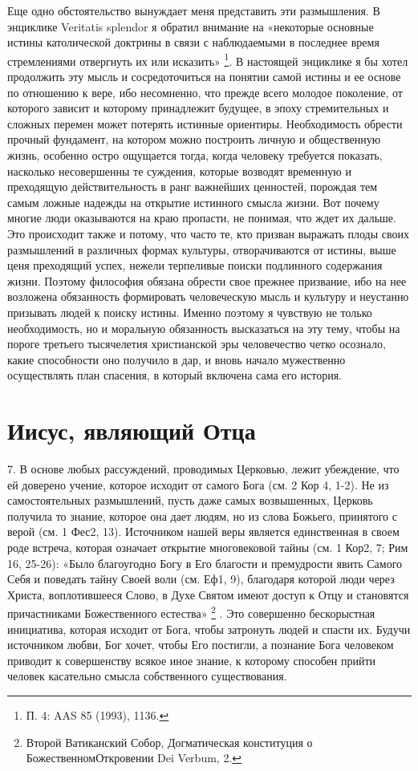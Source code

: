 \documentclass[a5paper,10pt]{article}
\begin{document}
Еще одно обстоятельство вынуждает меня представить эти размышления. В энциклике
Veritatis splendor я обратил внимание на «некоторые основные истины
католической доктрины в связи с наблюдаемыми в последнее время стремлениями
отвергнуть их или исказить» \footnote{П. 4: AAS 85 (1993), 1136.}. В настоящей
энциклике я бы хотел продолжить эту мысль и сосредоточиться на понятии самой
истины и ее основе по отношению к вере, ибо несомненно, что прежде всего
молодое поколение, от которого зависит и которому принадлежит будущее, в эпоху
стремительных и сложных перемен может потерять истинные ориентиры.
Необходимость обрести прочный фундамент, на котором можно построить личную и
общественную жизнь, особенно остро ощущается тогда, когда человеку требуется
показать, насколько несовершенны те суждения, которые возводят временную и
преходящую действительность в ранг важнейших ценностей, порождая тем самым
ложные надежды на открытие истинного смысла жизни. Вот почему многие люди
оказываются на краю пропасти, не понимая, что ждет их дальше. Это происходит
также и потому, что часто те, кто призван выражать плоды своих размышлений в
различных формах культуры, отворачиваются от истины, выше ценя преходящий
успех, нежели терпеливые поиски подлинного содержания жизни. Поэтому философия
обязана обрести свое прежнее призвание, ибо на нее возложена обязанность
формировать человеческую мысль и культуру и неустанно призывать людей к поиску
истины. Именно поэтому я чувствую не только необходимость, но и моральную
обязанность высказаться на эту тему, чтобы на пороге третьего тысячелетия
христианской эры человечество четко осознало, какие способности оно получило в
дар, и вновь начало мужественно осуществлять план спасения, в который включена
сама его история. 

\section{Иисус, являющий Отца}

7. В основе любых рассуждений, проводимых Церковью, лежит убеждение, что ей
доверено учение, которое исходит от самого Бога (см. 2 Кор 4, 1-2). Не из
самостоятельных размышлений, пусть даже самых возвышенных, Церковь получила то
знание, которое она дает людям, но из слова Божьего, принятого с верой (см. 1
Фес2, 13). Источником нашей веры является единственная в своем роде встреча,
которая означает открытие многовековой тайны (см. 1 Кор2, 7; Рим 16, 25-26):
«Было благоугодно Богу в Его благости и премудрости явить Самого Себя и
поведать тайну Своей воли (см. Еф1, 9), благодаря которой люди через Христа,
воплотившееся Слово, в Духе Святом имеют доступ к Отцу и становятся
причастниками Божественного естества» \footnote{Второй Ватиканский Собор,
Догматическая конституция о БожественномОткровении Dei Verbum, 2.} . Это
совершенно бескорыстная инициатива, которая исходит от Бога, чтобы затронуть
людей и спасти их. Будучи источником любви, Бог хочет, чтобы Его постигли, а
познание Бога человеком приводит к совершенству всякое иное знание, к которому
способен прийти человек касательно смысла собственного существования.
\end{document}
